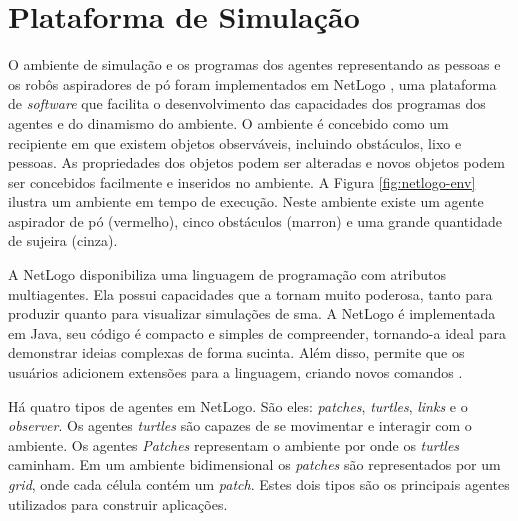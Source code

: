 \section{Plataforma de Simulação}
\label{sec:plat-sim}

O ambiente de simulação e os programas dos agentes representando as pessoas e os robôs aspiradores de pó foram implementados em NetLogo \cite{wilensky1999netlogo}, uma plataforma de \textit{software} que facilita o desenvolvimento das capacidades dos programas dos agentes e do dinamismo do ambiente. O ambiente é concebido como um recipiente em que existem objetos observáveis, incluindo obstáculos, lixo e pessoas. As propriedades dos objetos podem ser alteradas e novos objetos podem ser concebidos facilmente e inseridos no ambiente. A Figura \ref{fig:netlogo-env} ilustra um ambiente em tempo de execução. Neste ambiente existe um agente aspirador de pó (vermelho), cinco obstáculos (marron) e uma grande quantidade de sujeira (cinza).

\clearpage
\begin{figure}[h!]
    \centering
\end{figure}

A NetLogo disponibiliza uma linguagem de programação com atributos multiagentes. Ela possui capacidades que a tornam muito poderosa, tanto para produzir quanto para visualizar simulações de \acrlong{sma}. A NetLogo é implementada em Java, seu código é compacto e simples de compreender, tornando-a ideal para demonstrar ideias complexas de forma sucinta. Além disso, permite que os usuários adicionem extensões para a linguagem, criando novos comandos \cite{teahan2010artificial}.

Há quatro tipos de agentes em NetLogo. São eles: \textit{patches}, \textit{turtles}, \textit{links} e o \textit{observer}. Os agentes \textit{turtles} são capazes de se movimentar e interagir com o ambiente. Os agentes \textit{Patches} representam o ambiente por onde os \textit{turtles} caminham. Em um ambiente bidimensional os \textit{patches} são representados por um \textit{grid}, onde cada célula contém um \textit{patch}. Estes dois tipos são os principais agentes utilizados para construir aplicações. 

